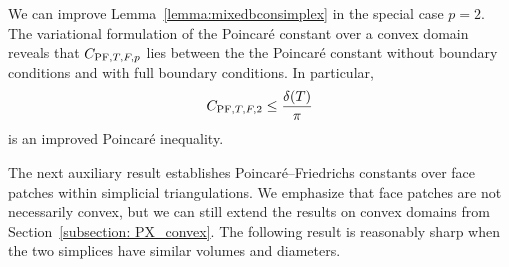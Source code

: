\documentclass[10pt,a4paper]{article}
\begin{document}
\begin{remark}\label{remark:mixedbconsimplex:hilbert}
    We can improve Lemma~\ref{lemma:mixedbconsimplex} in the special case $p=2$.
    The variational formulation of the Poincar\'e constant over a convex domain reveals that $C_{{\rm PF},T,F,p}$ lies between the the Poincar\'e constant without boundary conditions and with full boundary conditions. 
    In particular,
    \begin{align*}
        C_{{\rm PF},T,F,2} 
        \leq 
        \frac{ {\delta}(T) }{ \pi }
    \end{align*}
    is an improved Poincar\'e inequality.
\end{remark}


The next auxiliary result establishes Poincar\'e--Friedrichs constants over face patches within simplicial triangulations. 
We emphasize that face patches are not necessarily convex, but we can still extend the results on convex domains from Section~\ref{subsection: PX_convex}. The following result is reasonably sharp when the two simplices have similar volumes and diameters.
\end{document}
